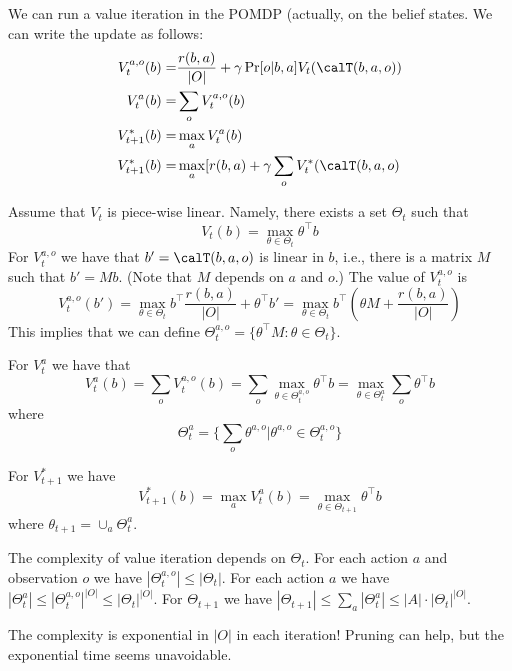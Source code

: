 We can run a value iteration in the POMDP (actually, on the belief
states. We can write the update as follows:
\begin{align*}
V^{a,o}_{t}(b)=&\frac{r(b,a)}{|O|}+\gamma\Pr[o|b,a]V_t(\calT(b,a,o))\\
V_{t}^a(b)=&\sum_o V^{a,o}_{t}(b)\\
V_{t+1}^*(b)=&\max_a V_{t}^a(b)\\
V_{t+1}^*(b) =& \max_a [r(b,a)+\gamma\sum_o V_t^*(\calT(b,a,o)
\end{align*}

Assume that $V_t$ is piece-wise linear. Namely, there exists a set
$\Theta_t$ such that
\[
V_t(b)=\max_{\theta\in\Theta_t}\theta^\top b
\]
For $V_t^{a,o}$ we have that $b'=\calT(b,a,o)$ is linear in $b$,
i.e., there is a matrix $M$ such that $b'=Mb$. (Note that $M$
depends on $a$ and $o$.) The value of $V_t^{a,o}$ is
\[
V_t^{a,o}(b')=\max_{\theta\in\Theta_t} b^\top \frac{r(b,a)}{|O|}+
\theta^\top b'= \max_{\theta\in\Theta_t} b^\top (\theta
M+\frac{r(b,a)}{|O|})
\]
This implies that we can define $\Theta_t^{a,o}=\{\theta^\top
M:\theta \in \Theta_t\}$.

For $V^a_t$ we have that
\[
V_t^a(b)=\sum_o V_t^{a,o}(b)=\sum_o \max_{\theta\in\Theta_t^{a,o}}
\theta^\top b=\max_{\theta\in\Theta_t^{a}}\sum_o  \theta^\top b
\]
where
\[
\Theta^a_t=\{\sum_o
\theta^{a,o}|\theta^{a,o}\in\Theta^{a,o}_t\}
\]

For $V_{t+1}^*$ we have
\[
V^*_{t+1}(b)=\max_a V_t^a(b)=\max_{\theta\in\Theta_{t+1}}
\theta^\top b
\]
where $\theta_{t+1}=\cup_a \Theta^a_t$.
%

The complexity of value iteration depends on $\Theta_t$. For each
action $a$ and observation $o$ we have $|\Theta^{a,o}_t|\leq
|\Theta_t|$. For each action $a$ we have $|\Theta^a_t|\leq
{|\Theta^{a,o}_t|}^{|O|}\leq {|\Theta_t|}^{|O|}$. For $\Theta_{t+1}$
we have $|\Theta_{t+1}|\leq \sum_a |\Theta_t^a|\leq |A|\cdot
|\Theta_t|^{|O|}$.

The complexity is exponential in $|O|$ in each iteration! Pruning
can help, but the exponential time seems unavoidable.

